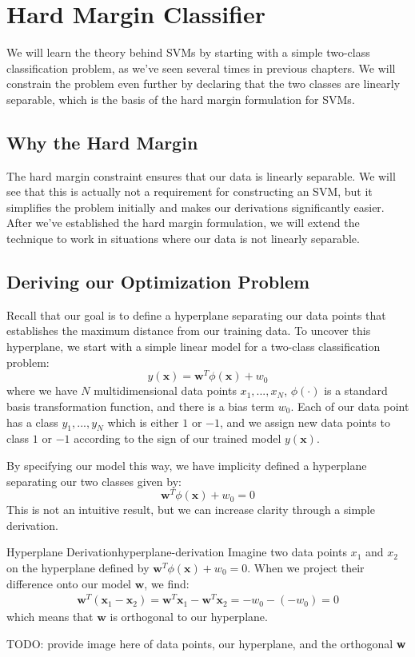\section{Hard Margin Classifier}
We will learn the theory behind SVMs by starting with a simple two-class classification problem, as we've seen several times in previous chapters. We will constrain the problem even further by declaring that the two classes are linearly separable, which is the basis of the hard margin formulation for SVMs.

\subsection{Why the Hard Margin}
The hard margin constraint ensures that our data is linearly separable. We will see that this is actually not a requirement for constructing an SVM, but it simplifies the problem initially and makes our derivations significantly easier. After we've established the hard margin formulation, we will extend the technique to work in situations where our data is not linearly separable.

\subsection{Deriving our Optimization Problem}
Recall that our goal is to define a hyperplane separating our data points that establishes the maximum distance from our training data. To uncover this hyperplane, we start with a simple linear model for a two-class classification problem:
\begin{equation*}
y(\textbf{x}) = \textbf{w}^{T}\phi(\textbf{x}) + w_{0}
\end{equation*}
where we have $N$ multidimensional data points $x_{1}, ..., x_{N}$, $\phi(\cdot)$ is a standard basis transformation function, and there is a bias term $w_{0}$. Each of our data point has a class $y_{1}, ..., y_{N}$ which is either $1$ or $-1$, and we assign new data points to class $1$ or $-1$ according to the sign of our trained model $y(\textbf{x})$.

By specifying our model this way, we have implicity defined a hyperplane separating our two classes given by:
\begin{equation} \label{implicit-hyperplane}
	\textbf{w}^{T}\phi(\textbf{x}) + w_{0} = 0
\end{equation}
This is not an intuitive result, but we can increase clarity through a simple derivation.

\begin{derivation}{Hyperplane Derivation}{hyperplane-derivation}
	Imagine two data points $x_{1}$ and $x_{2}$ on the hyperplane defined by $\textbf{w}^{T}\phi(\textbf{x}) + w_{0} = 0$. When we project their difference onto our model $\textbf{w}$, we find:
	\begin{align*}
		\textbf{w}^{T}(\textbf{x}_{1} - \textbf{x}_{2}) = \textbf{w}^{T}\textbf{x}_{1} - \textbf{w}^{T}\textbf{x}_{2} = -w_{0} - (-w_{0}) = 0
	\end{align*}
	which means that $\textbf{w}$ is orthogonal to our hyperplane.
\end{derivation}
TODO: provide image here of data points, our hyperplane, and the orthogonal \textbf{w}

